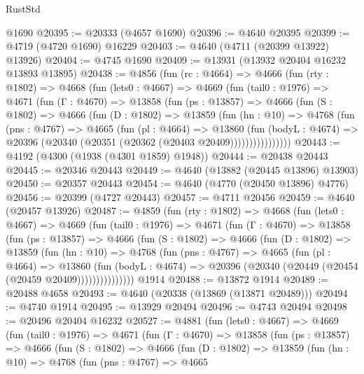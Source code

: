 \begin{lexlean}{RustStd}
\begin{coremodule}
    @1690
@20395 := @20333 (@4657 @1690)
@20396 := @4640 @20395
@20399 := @4719 (@4720 @1690) @16229
@20403 := @4640 (@4711 (@20399 @13922) @13926)
@20404 := @4745 @1690
@20409 := @13931 (@13932 @20404 @16232 @13893 @13895)
@20438 := @4856
    (fun (rc : @4664) =>
    @4666
      (fun (rty : @1802) =>
      @4668
        (fun (lets0 : @4667) =>
        @4669
          (fun (tail0 : @1976) =>
          @4671
            (fun (Γ : @4670) =>
            @13858
              (fun (ps : @13857) =>
              @4666
                (fun (S : @1802) =>
                @4666
                  (fun (D : @1802) =>
                  @13859
                    (fun (hn : @10) =>
                    @4768
                      (fun (pns : @4767) =>
                      @4665
                        (fun (pl : @4664) =>
                        @13860
                          (fun (bodyL : @4674) =>
                          @20396 (@20340 (@20351 (@20362 (@20403 @20409))))))))))))))))
@20443 := @4192 (@4300 (@1938 (@4301 @1859) @1948))
@20444 := @20438 @20443
@20445 := @20346 @20443
@20449 := @4640 (@13882 (@20445 @13896) @13903)
@20450 := @20357 @20443
@20454 := @4640 (@4770 (@20450 @13896) @4776)
@20456 := @20399 (@4727 @20443)
@20457 := @4711 @20456
@20459 := @4640 (@20457 @13926)
@20487 := @4859
    (fun (rty : @1802) =>
    @4668
      (fun (lets0 : @4667) =>
      @4669
        (fun (tail0 : @1976) =>
        @4671
          (fun (Γ : @4670) =>
          @13858
            (fun (ps : @13857) =>
            @4666
              (fun (S : @1802) =>
              @4666
                (fun (D : @1802) =>
                @13859
                  (fun (hn : @10) =>
                  @4768
                    (fun (pns : @4767) =>
                    @4665
                      (fun (pl : @4664) =>
                      @13860
                        (fun (bodyL : @4674) =>
                        @20396 (@20340 (@20449 (@20454 (@20459 @20409)))))))))))))))
    @1914
@20488 := @13872 @1914
@20489 := @20488 @4658
@20493 := @4640 (@20338 (@13869 (@13871 @20489)))
@20494 := @4740 @1914
@20495 := @13929 @20494
@20496 := @4743 @20494
@20498 := @20496 @20404 @16232
@20527 := @4881
    (fun (lets0 : @4667) =>
    @4669
      (fun (tail0 : @1976) =>
      @4671
        (fun (Γ : @4670) =>
        @13858
          (fun (ps : @13857) =>
          @4666
            (fun (S : @1802) =>
            @4666
              (fun (D : @1802) =>
              @13859
                (fun (hn : @10) =>
                @4768
                  (fun (pns : @4767) =>
                  @4665

\end{coremodule}
\end{lexlean}
